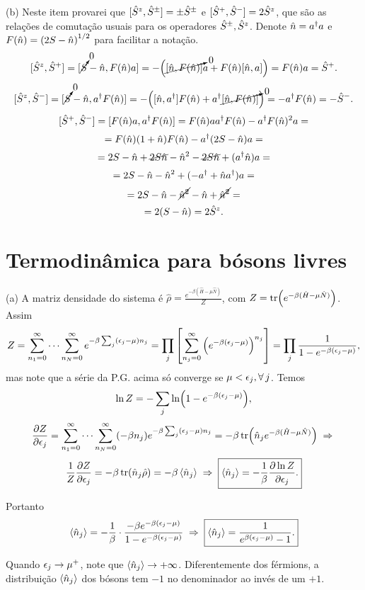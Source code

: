 \documentclass[a4paper,10pt]{article}
\begin{document}
\n

(b) Neste item provarei que $[\S^z, \S^\pm] = \pm \S^\pm$ e $[\S^+, \S^-] = 2 \S^z$, que são as relações de comutação usuais para os operadores $\S^\pm, \S^z$. Denote $\nn = a^\d a$ e $F(\nn) = \qty(2S - \nn)^{1/2}$ para facilitar a notação.
$$
[\S^z, \S^+] = [ \cancelto{0}{S} - \nn , F(\nn) a] =
- \Big(
\cancelto{0}{[ \nn, F(\nn) ]} a + F(\nn) [ \nn, a ]
\Big) =
F(\nn) a = \S^+.
$$
$$
[\S^z, \S^-] = [ \cancelto{0}{S} - \nn , a^\d F(\nn)] =
- \Big(
[ \nn, a^\d ] F(\nn) + a^\d \cancelto{0}{[ \nn, F(\nn) ]}
\Big) =
- a^\d F(\nn) = - \S^-.
$$
$$
[\S^+, \S^-] = [ F(\nn) a, a^\d F(\nn) ] =
F(\nn) a a^\d F(\nn) - a^\d F(\nn)^2 a =
$$
$$
= F(\nn) (1 + \nn) F(\nn) - a^\d (2S - \nn) a =
$$
$$
= 2S - \nn + \cancel{2S \nn} - \nn^2 - \cancel{2S \nn} + (a^\d \nn) a =
$$
$$
= 2S - \nn - \nn^2 + (-a^\d + \nn a^\d) a =
$$
$$
= 2S - \nn - \cancel{\nn^2} - \nn + \cancel{\nn^2} =
$$
$$
= 2 (S - \nn) = 2 \S^z.
$$



\pagebreak



\section{Termodinâmica para bósons livres}


(a) A matriz densidade do sistema é $\hat{\rho} = \frac{e^{-\beta(\hat{H} - \mu \hat{N})}}{Z}$, com $Z = \tr(e^{-\beta(\hat{H} - \mu \hat{N})})$. Assim
$$
Z = \sum_{n_1 = 0}^{\infty} \cdots \sum_{n_N = 0}^{\infty}
e^{-\beta \sum_{j} (\eps_j - \mu) n_j} =
\prod_j \qty[ \sum_{n_j = 0}^{\infty}
\qty( e^{-\beta (\eps_j - \mu)} )^{n_j} ] =
\prod_j \frac{1}{1 - e^{-\beta(\eps_j - \mu)}},
$$
mas note que a série da P.G. acima só converge se $\mu < \eps_j, \ptodo j$. Temos
$$
\ln Z = - \sum_{j} \ln( 1 - e^{-\beta (\eps_j - \mu)} ),
$$
$$
\pdv{Z}{\eps_j} = \sum_{n_1 = 0}^{\infty} \cdots \sum_{n_N = 0}^{\infty}
(- \beta n_j) e^{-\beta \sum_{j} (\eps_j - \mu) n_j} =
- \beta \tr( \nn_j e^{-\beta(\hat{H} - \mu \hat{N})} ) \implies
$$
$$
\frac{1}{Z} \pdv{Z}{\eps_j} = - \beta \tr(\nn_j \hat{\rho}) = - \beta \ev{\nn_j}
\implies
\boxed{ \ev{\nn_j} = - \frac{1}{\beta} \pdv{\ln Z}{\eps_j}. }
$$

Portanto
$$
\ev{\nn_j} = - \frac{1}{\beta} \cdot
\frac{ - \beta e^{-\beta(\eps_j - \mu)}}{1 - e^{-\beta(\eps_j - \mu)}} \implies
\boxed{ \ev{\nn_j} = \frac{1}{e^{\beta (\eps_j - \mu)} - 1}. }
$$

Quando $\eps_j \to \mu^+$, note que $\ev{\nn_j} \to +\infty$. Diferentemente dos férmions, a distribuição $\ev{\nn_j}$ dos bósons tem $-1$ no denominador ao invés de um $+1$.
\end{document}
